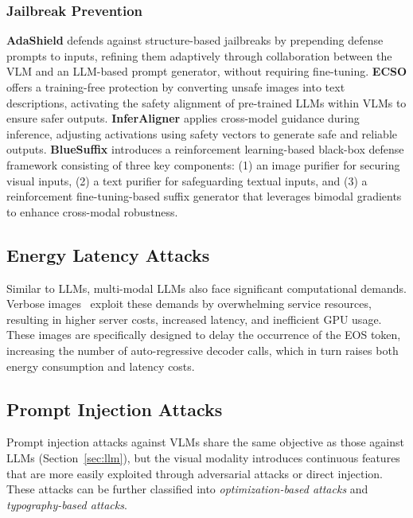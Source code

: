\subsubsection{Jailbreak Prevention}
\textbf{AdaShield} \cite{wang2024adashield} defends against structure-based jailbreaks by prepending defense prompts to inputs, refining them adaptively through collaboration between the VLM and an LLM-based prompt generator, without requiring fine-tuning. \textbf{ECSO} \cite{gou2024eyes} offers a training-free protection by converting unsafe images into text descriptions, activating the safety alignment of pre-trained LLMs within VLMs to ensure safer outputs. 
\textbf{InferAligner} \cite{wang2024inferaligner} applies cross-model guidance during inference, adjusting activations using safety vectors to generate safe and reliable outputs. \textbf{BlueSuffix} \cite{zhao2024bluesuffix} introduces a reinforcement learning-based black-box defense framework consisting of three key components: (1) an image purifier for securing visual inputs, (2) a text purifier for safeguarding textual inputs, and (3) a reinforcement fine-tuning-based suffix generator that leverages bimodal gradients to enhance cross-modal robustness.

\subsection{Energy Latency Attacks}
\label{sec:vlm-latency}
Similar to LLMs, multi-modal LLMs also face significant computational demands. Verbose images~\cite{gaoinducing} exploit these demands by overwhelming service resources, resulting in higher server costs, increased latency, and inefficient GPU usage. These images are specifically designed to delay the occurrence of the EOS token, increasing the number of auto-regressive decoder calls, which in turn raises both energy consumption and latency costs.



\subsection{Prompt Injection Attacks}
\label{sec:vlm-injection}

Prompt injection attacks against VLMs share the same objective as those against LLMs (Section~\ref{sec:llm}), but the visual modality introduces continuous features that are more easily exploited through adversarial attacks or direct injection. These attacks can be further classified into \emph{optimization-based attacks} and \emph{typography-based attacks}.

